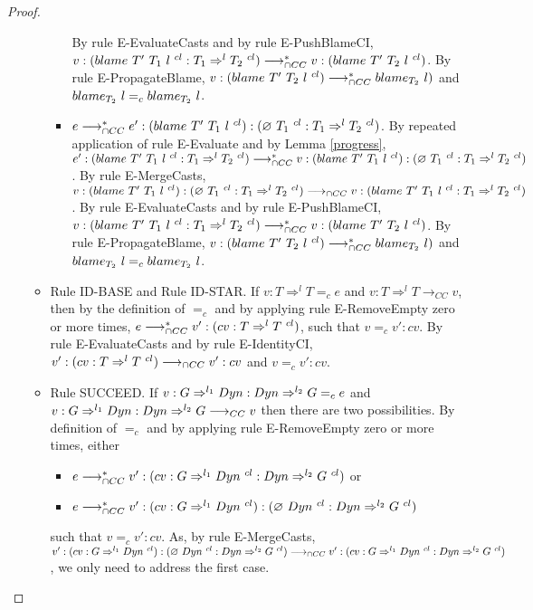\documentclass[a4paper]{article}
\begin{document}
\begin{proof}
\begin{itemize}
\begin{itemize}
\begin{itemize}
            By rule E-EvaluateCasts and by rule E-PushBlameCI, $v : (blame\ T'\ T_1\ l\ ^{cl} : T_1 \Rightarrow^l T_2\ ^{cl}) \longrightarrow_{\cap CC}^* v : (blame\ T'\ T_2\ l\ ^{cl})$.
            By rule E-PropagateBlame, $v : (blame\ T'\ T_2\ l\ ^{cl}) \longrightarrow_{\cap CC}^* blame_{T_2}\ l)$ and $blame_{T_2}\ l =_c blame_{T_2}\ l$.
            \item $e \longrightarrow_{\cap CC}^* e' : (blame\ T'\ T_1\ l\ ^{cl}) : (\varnothing\ T_1\ ^{cl} : T_1 \Rightarrow^l T_2\ ^{cl})$.
            By repeated application of rule E-Evaluate and by Lemma \ref{progress}, $e' : (blame\ T'\ T_1\ l\ ^{cl} : T_1 \Rightarrow^l T_2\ ^{cl}) \longrightarrow_{\cap CC}^* v : (blame\ T'\ T_1\ l\ ^{cl}) : (\varnothing\ T_1\ ^{cl} : T_1 \Rightarrow^l T_2\ ^{cl})$.
            By rule E-MergeCasts, $v : (blame\ T'\ T_1\ l\ ^{cl}) : (\varnothing\ T_1\ ^{cl} : T_1 \Rightarrow^l T_2\ ^{cl}) \longrightarrow_{\cap CC} v : (blame\ T'\ T_1\ l\ ^{cl} : T_1 \Rightarrow^l T_2\ ^{cl})$.
            By rule E-EvaluateCasts and by rule E-PushBlameCI, $v : (blame\ T'\ T_1\ l\ ^{cl} : T_1 \Rightarrow^l T_2\ ^{cl}) \longrightarrow_{\cap CC}^* v : (blame\ T'\ T_2\ l\ ^{cl})$.
            By rule E-PropagateBlame, $v : (blame\ T'\ T_2\ l\ ^{cl}) \longrightarrow_{\cap CC}^* blame_{T_2}\ l)$ and $blame_{T_2}\ l =_c blame_{T_2}\ l$.
        \end{itemize}
        \item Rule ID-BASE and Rule ID-STAR.
        If $v : T \Rightarrow^l T =_c e$ and $v : T \Rightarrow^l T \longrightarrow_{CC} v$, then by the definition of $=_c$ and by applying rule E-RemoveEmpty zero or more times, $e \gios^* v' : (cv : T \Rightarrow^l T\ ^{cl})$, such that $v =_c v' : cv$.
        By rule E-EvaluateCasts and by rule E-IdentityCI, $v' : (cv : T \Rightarrow^l T\ ^{cl}) \longrightarrow_{\cap CC} v' : cv$ and $v =_c v' : cv$.
        \item Rule SUCCEED.
        If $v : G \Rightarrow^{l_1} Dyn : Dyn \Rightarrow^{l_2} G =_c e$ and $v : G \Rightarrow^{l_1} Dyn : Dyn \Rightarrow^{l_2} G \longrightarrow_{CC} v$ then there are two possibilities.
        By definition of $=_c$ and by applying rule E-RemoveEmpty zero or more times, either
        \begin{itemize}
            \item $e \longrightarrow_{\cap CC}^* v' : (cv : G \Rightarrow^{l_1} Dyn\ ^{cl} : Dyn \Rightarrow^{l_2} G\ ^{cl})$ or
            \item $e \longrightarrow_{\cap CC}^* v' : (cv : G \Rightarrow^{l_1} Dyn\ ^{cl}) : (\varnothing\ Dyn\ ^{cl} : Dyn \Rightarrow^{l_2} G\ ^{cl})$
        \end{itemize}
        such that $v =_c v' : cv$.
        As, by rule E-MergeCasts, $v' : (cv : G \Rightarrow^{l_1} \Dyn\ ^{cl}) : (\emptycast{\Dyn}{cl} : \Dyn \Rightarrow^{l_2} G\ ^{cl}) \gios v' : (cv : G \Rightarrow^{l_1} \Dyn\ ^{cl} : \Dyn \Rightarrow^{l_2} G\ ^{cl})$, we only need to address the first case.

\end{itemize}
\end{itemize}
\end{proof}
\end{document}
